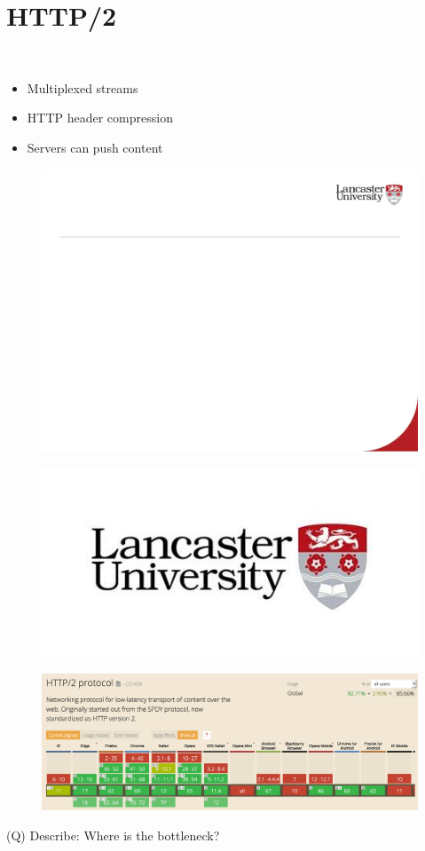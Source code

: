 \documentclass[12pt]{article}
\begin{document}
\section{HTTP/2}
\\
\begin{itemize}
  \item Multiplexed streams
  \item HTTP header compression
  \item Servers can push content
\end{itemize}
\begin{figure}[H]
\includegraphics[width=0.5\linewidth]{page81-image-1.png}
\end{figure}
\begin{figure}[H]
\includegraphics[width=0.5\linewidth]{page81-image-2.png}
\end{figure}
\begin{figure}[H]
\includegraphics[width=0.5\linewidth]{page81-image-3.png}
\end{figure}
\clearpage
(Q)
Describe: Where is the bottleneck?
\clearpage
\end{document}
